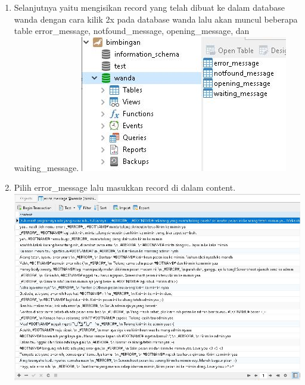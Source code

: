 \documentclass{article}
\newcounter{saveenumi}
\newcommand{\seti}{\setcounter{saveenumi}{\value{enumi}}} %
\begin{document}
\begin{enumerate}
	        \newline
    \item Selanjutnya yaitu mengisikan record yang telah dibuat ke dalam database wanda dengan cara kilik 2x pada database wanda lalu akan muncul beberapa table error\_message, notfound\_message, opening\_message, dan waiting\_message.
		    \newline
		    \includegraphics[scale=0.5]{28.5.jpg}
		    \newline
    \item Pilih error\_message lalu masukkan record di dalam content.
	        \newline
	        \includegraphics[scale=0.4]{28.4.jpg}
	        \newline
	\seti %
\end{enumerate}
\end{document}
